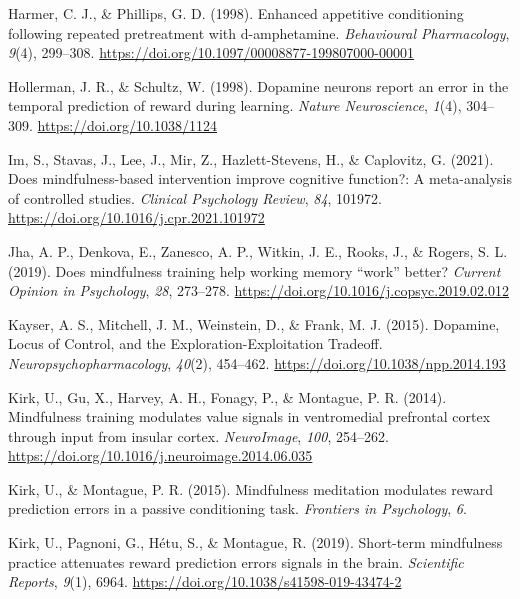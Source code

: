 \documentclass[
  man]{apa6}
\newlength{\cslhangindent}
\newlength{\cslentryspacingunit} %
\newenvironment{CSLReferences}[2] %
 {%
  \setlength{\parindent}{0pt}
  \ifodd #1
  \let\oldpar\par
  \def\par{\hangindent=\cslhangindent\oldpar}
  \fi
  \setlength{\parskip}{#2\cslentryspacingunit}
 }%
 {}
\begin{document}
\begin{CSLReferences}{1}{0}
\leavevmode{}%
Harmer, C. J., \& Phillips, G. D. (1998). Enhanced appetitive conditioning following repeated pretreatment with d-amphetamine. \emph{Behavioural Pharmacology}, \emph{9}(4), 299--308. \url{https://doi.org/10.1097/00008877-199807000-00001}

\leavevmode{}%
Hollerman, J. R., \& Schultz, W. (1998). Dopamine neurons report an error in the temporal prediction of reward during learning. \emph{Nature Neuroscience}, \emph{1}(4), 304--309. \url{https://doi.org/10.1038/1124}

\leavevmode{}%
Im, S., Stavas, J., Lee, J., Mir, Z., Hazlett-Stevens, H., \& Caplovitz, G. (2021). Does mindfulness-based intervention improve cognitive function?: {A} meta-analysis of controlled studies. \emph{Clinical Psychology Review}, \emph{84}, 101972. \url{https://doi.org/10.1016/j.cpr.2021.101972}

\leavevmode{}%
Jha, A. P., Denkova, E., Zanesco, A. P., Witkin, J. E., Rooks, J., \& Rogers, S. L. (2019). Does mindfulness training help working memory {``work''} better? \emph{Current Opinion in Psychology}, \emph{28}, 273--278. \url{https://doi.org/10.1016/j.copsyc.2019.02.012}

\leavevmode{}%
Kayser, A. S., Mitchell, J. M., Weinstein, D., \& Frank, M. J. (2015). Dopamine, {Locus} of {Control}, and the {Exploration-Exploitation Tradeoff}. \emph{Neuropsychopharmacology}, \emph{40}(2), 454--462. \url{https://doi.org/10.1038/npp.2014.193}

\leavevmode{}%
Kirk, U., Gu, X., Harvey, A. H., Fonagy, P., \& Montague, P. R. (2014). Mindfulness training modulates value signals in ventromedial prefrontal cortex through input from insular cortex. \emph{NeuroImage}, \emph{100}, 254--262. \url{https://doi.org/10.1016/j.neuroimage.2014.06.035}

\leavevmode{}%
Kirk, U., \& Montague, P. R. (2015). Mindfulness meditation modulates reward prediction errors in a passive conditioning task. \emph{Frontiers in Psychology}, \emph{6}.

\leavevmode{}%
Kirk, U., Pagnoni, G., Hétu, S., \& Montague, R. (2019). Short-term mindfulness practice attenuates reward prediction errors signals in the brain. \emph{Scientific Reports}, \emph{9}(1), 6964. \url{https://doi.org/10.1038/s41598-019-43474-2}


\end{CSLReferences}
\end{document}
